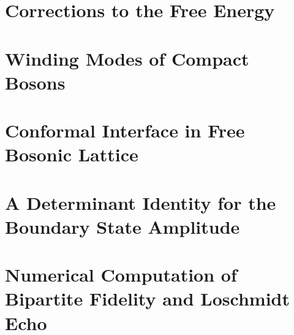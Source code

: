 \documentclass[reprint, prb]{revtex4-1}
\begin{document}
\section{Corrections to the Free Energy}
\label{app:F_correction}


\section{Winding Modes of Compact Bosons}
\label{app:compact_diff_boson}


\section{Conformal Interface in Free Bosonic Lattice}
\label{app:interface_free_boson}


\section{A Determinant Identity for the Boundary State Amplitude}
\label{app:pf_of_id}


\section{Numerical Computation of Bipartite Fidelity and Loschmidt Echo}
\label{app:comp_fid_echo}




\end{document}
